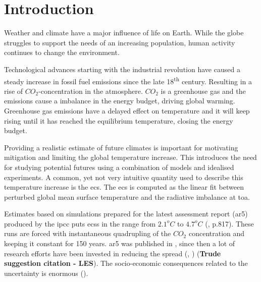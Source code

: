 \chapter{Introduction} \label{ch:introduction}
Weather and climate have a major influence of life on Earth. While the globe struggles to support the needs of an increasing population, human activity continues to change the environment. %

Technological advances starting with the industrial revolution have caused a steady increase in fossil fuel emissions since the late 18\textsuperscript{th} century. %
Resulting in a rise of $CO_2$-concentration in the atmosphere. $CO_2$ is a greenhouse gas and the emissions cause a imbalance in the energy budget, driving global warming.
Greenhouse gas emissions have a delayed effect on temperature and it will keep rising until it has reached the equilibrium temperature, closing the energy budget. 

Providing a realistic estimate of future climates is important for motivating mitigation and limiting the global temperature increase. 
This introduces the need for studying potential futures using a combination of models and idealised experiments. A common, yet not very intuitive quantity used to describe this temperature increase is the \acrfull{ecs}. The \acrshort{ecs} is computed as the linear fit between perturbed global mean surface temperature and the radiative imbalance at \acrfull{toa}.

Estimates based on %
simulations prepared for the latest assessment report (\acrshort{ar5}) produced by the \acrfull{ipcc} puts \acrshort{ecs}s in the range from $2.1^oC$ to $4.7^oC$ (\cite{IPCC_CH9_climate_models}, p.817). These runs are forced with instantaneous quadrupling of the $CO_2$ concentration %
and keeping it constant for 150 years.  
\acrshort{ar5} was published in \citeyear{IPCC_entire_book}, since then a lot of research efforts have been invested in reducing the spread (\cite{Hall2019}, \cite{Cox2018}) (\textbf{Trude suggestion citation - LES}).
The socio-economic consequences related to the uncertainty is enormous (\cite{bony2015}). 

